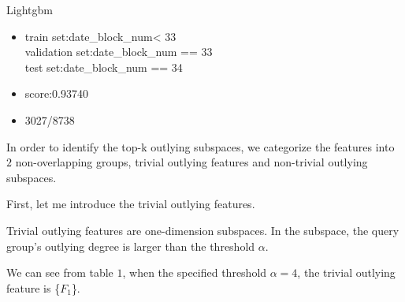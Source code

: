 \documentclass[
 size=12pt,
 paper=smartboard,  %
 mode=present, 		%
 display=slides, 	%
 style=tuliplab,  	%
 pauseslide,
 fleqn,leqno]{powerdot}
\begin{document}
\begin{slide}{Lightgbm}
  \begin{itemize}
    \item
    train set:date_block_num< 33 \\
    validation set:date_block_num == 33 \\
    test set:date_block_num == 34 \\
    \smallskip
    \item
    score:0.93740
    \smallskip
    \item
    3027/8738
  \end{itemize}
    
    \begin{note}
    In order to identify the top-k outlying subspaces,
    we categorize the features into $2$ non-overlapping groups,
    trivial outlying features and non-trivial outlying subspaces.
    
    First, let me introduce the trivial outlying features.
    
    Trivial outlying features are one-dimension subspaces.
    In the subspace,
    the query group's outlying degree is larger than the threshold $\alpha$.
    
    We can see from table $1$,
    when the specified threshold $\alpha = 4$,
    the trivial outlying feature is \{$F_1$\}.
    \end{note}
    
    \end{slide}
\end{document}
